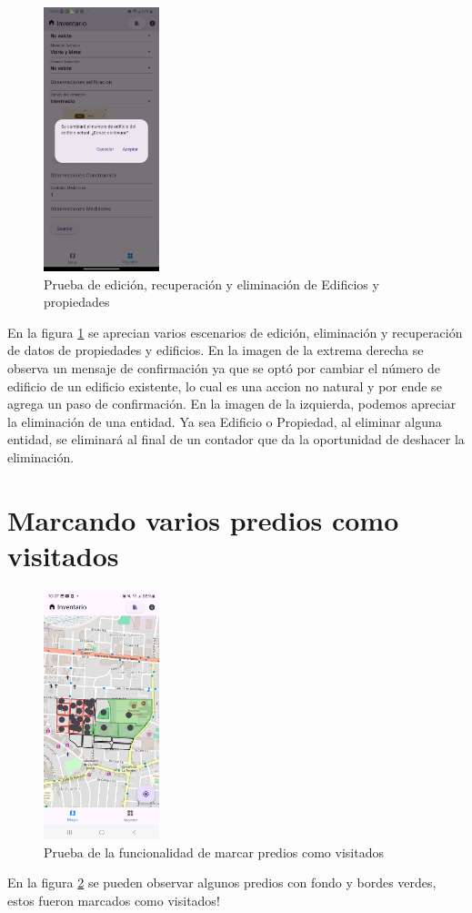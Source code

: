 \begin{figure}[h]
    \includegraphics[width=0.3\textwidth]{Graphics/Capitulo 4/LG Android 13/4.4/4.png}
    \caption{Prueba de edición, recuperación y eliminación de Edificios y propiedades}
    \label{fig:figura21}
\end{figure}

En la figura \ref{fig:figura21} se aprecian varios escenarios de edición, eliminación y recuperación de datos de propiedades y edificios. En la imagen de la extrema derecha
se observa un mensaje de confirmación ya que se optó por cambiar el número de edificio de un edificio existente, lo cual es una accion no natural y por ende se agrega un paso de confirmación.
En la imagen de la izquierda, podemos apreciar la eliminación de una entidad. Ya sea Edificio o Propiedad, al eliminar alguna entidad, se eliminará al final de un contador que da la oportunidad
de deshacer la eliminación.

\pagebreak

\section{Marcando varios predios como visitados}
\begin{figure}[h]
    \centering
    \includegraphics[width=0.3\textwidth]{Graphics/Capitulo 4/Galaxy S23 Ultra Android/4.6/1.jpg}
    \caption{Prueba de la funcionalidad de marcar predios como visitados}
    \label{fig:figura22}
\end{figure}
En la figura \ref{fig:figura22} se pueden observar algunos predios con fondo y bordes verdes, estos fueron marcados como visitados!
\pagebreak
